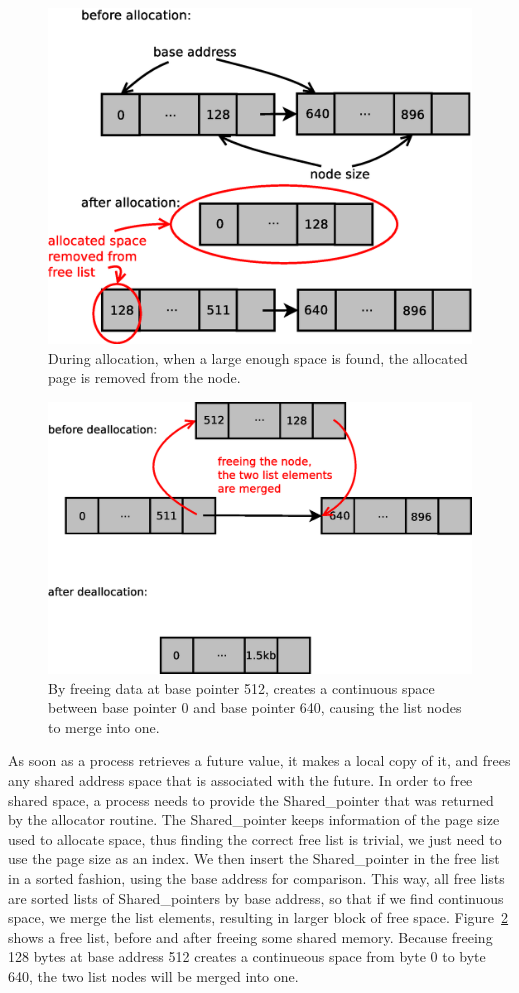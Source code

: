 \begin{figure}[!ht]
\includegraphics[width=0.6\columnwidth]{figures/alloc}
\caption{During allocation, when a large enough space is found, the allocated page is removed from the node.}
\label{fig:alloc}
\end{figure}

\begin{figure}[!ht]
\includegraphics[width=0.7\columnwidth]{figures/free}
\caption{By freeing data at base pointer 512, creates a continuous space between base pointer 0 and
base pointer 640, causing the list nodes to merge into one.}
\label{fig:free}
\end{figure}

As soon as a process retrieves a future value, it makes a local copy of it, and frees any shared address space
that is associated with the future.  In order to free shared space, a process needs to provide the Shared\_pointer
that was returned by the allocator routine.  The Shared\_pointer keeps information of the page size used to 
allocate space, thus finding the correct free list is trivial, we just need to use the page size as an index.
We then insert the Shared\_pointer in the free list in a sorted fashion, using the base address for comparison.
This way, all free lists are sorted lists of Shared\_pointers by base address, so that if we find continuous
space, we merge the list elements, resulting in larger block of free space.  Figure~\ref{fig:free} shows a 
free list, before and after freeing some shared memory.  Because freeing 128 bytes at base address 512 creates
a continueous space from byte 0 to byte 640, the two list nodes will be merged into one.

